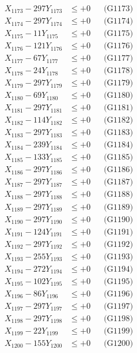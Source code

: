 \documentclass[a4paper,10pt]{article}
\begin{document}
{\begin{align}
X_{1173} - 297Y_{1173} &\leq +0 && \text{(G1173)} \\
X_{1174} - 297Y_{1174} &\leq +0 && \text{(G1174)} \\
X_{1175} - 11Y_{1175} &\leq +0 && \text{(G1175)} \\
X_{1176} - 121Y_{1176} &\leq +0 && \text{(G1176)} \\
X_{1177} - 67Y_{1177} &\leq +0 && \text{(G1177)} \\
X_{1178} - 24Y_{1178} &\leq +0 && \text{(G1178)} \\
X_{1179} - 297Y_{1179} &\leq +0 && \text{(G1179)} \\
X_{1180} - 69Y_{1180} &\leq +0 && \text{(G1180)} \\
\allowbreak
X_{1181} - 297Y_{1181} &\leq +0 && \text{(G1181)} \\
X_{1182} - 114Y_{1182} &\leq +0 && \text{(G1182)} \\
X_{1183} - 297Y_{1183} &\leq +0 && \text{(G1183)} \\
X_{1184} - 239Y_{1184} &\leq +0 && \text{(G1184)} \\
X_{1185} - 133Y_{1185} &\leq +0 && \text{(G1185)} \\
X_{1186} - 297Y_{1186} &\leq +0 && \text{(G1186)} \\
X_{1187} - 297Y_{1187} &\leq +0 && \text{(G1187)} \\
X_{1188} - 297Y_{1188} &\leq +0 && \text{(G1188)} \\
X_{1189} - 297Y_{1189} &\leq +0 && \text{(G1189)} \\
X_{1190} - 297Y_{1190} &\leq +0 && \text{(G1190)} \\
\allowbreak
X_{1191} - 124Y_{1191} &\leq +0 && \text{(G1191)} \\
X_{1192} - 297Y_{1192} &\leq +0 && \text{(G1192)} \\
X_{1193} - 255Y_{1193} &\leq +0 && \text{(G1193)} \\
X_{1194} - 272Y_{1194} &\leq +0 && \text{(G1194)} \\
X_{1195} - 102Y_{1195} &\leq +0 && \text{(G1195)} \\
X_{1196} - 86Y_{1196} &\leq +0 && \text{(G1196)} \\
X_{1197} - 297Y_{1197} &\leq +0 && \text{(G1197)} \\
X_{1198} - 297Y_{1198} &\leq +0 && \text{(G1198)} \\
X_{1199} - 22Y_{1199} &\leq +0 && \text{(G1199)} \\
X_{1200} - 155Y_{1200} &\leq +0 && \text{(G1200)} \\

\end{align}}
\end{document}
